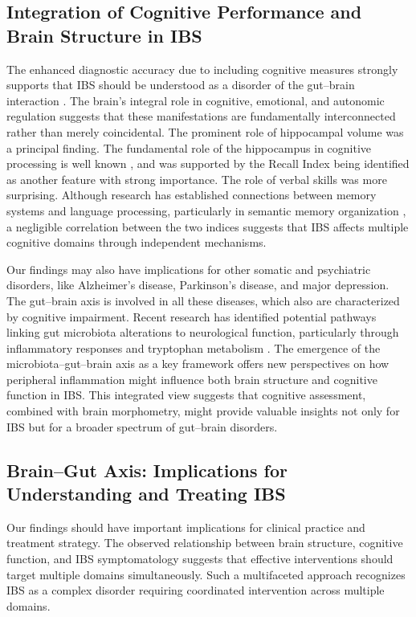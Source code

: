 \documentclass[diagnostics,article,accept,pdftex,moreauthors]{Definitions/mdpi}
\begin{document}
\subsection{Integration of Cognitive Performance and Brain Structure in IBS}
The enhanced diagnostic accuracy due to including cognitive measures strongly supports that IBS should be understood as a disorder of the gut--brain interaction \cite{Mayer2022, zhao2023functional}. The brain's integral role in cognitive, emotional, and autonomic regulation suggests that these manifestations are fundamentally interconnected rather than merely coincidental. The prominent role of hippocampal volume was a principal finding. The fundamental role of the hippocampus in cognitive processing is well known \cite{lisman2017viewpoints}, and was supported by the Recall Index being identified as another feature with strong importance.  The role of verbal skills was more surprising. Although research has established connections between memory systems and language processing, particularly in semantic memory organization \cite{burgess2002human}, a negligible correlation between the two indices suggests that IBS affects multiple cognitive domains through independent mechanisms. 


Our findings may also have implications for other somatic and psychiatric disorders, like Alzheimer's disease, Parkinson's disease, and major depression. The gut--brain axis is involved in all these diseases, which also are characterized by cognitive impairment. Recent research has identified potential pathways linking gut microbiota alterations to neurological function, particularly through inflammatory responses and tryptophan metabolism \cite{sibelli2016systematic, carloni2023gut}. The emergence of the microbiota--gut--brain axis as a key framework \cite{ishioh2024brain} offers new perspectives on how peripheral inflammation might influence both brain structure and cognitive function in IBS. This integrated view suggests that cognitive assessment, combined with brain morphometry, might provide valuable insights not only for IBS but for a broader spectrum of gut--brain disorders. 


\subsection{Brain--Gut Axis: Implications for Understanding and Treating IBS}
Our findings should have important implications for clinical practice and treatment strategy. The observed relationship between brain structure, cognitive function, and IBS symptomatology suggests that effective interventions should target multiple domains simultaneously. Such a multifaceted approach recognizes IBS as a complex disorder requiring coordinated intervention across multiple domains. 
\end{document}
